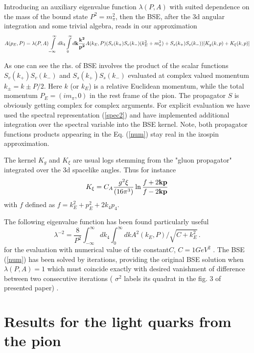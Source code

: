 \documentclass[aps,prd,superscriptaddress,eqsecnum,amsfonts,showpacs,epsfig]{revtex4}
\newcommand{\be}{\begin{equation}}
\newcommand{\ee}{\end{equation}}
\newcommand{\bea}{\begin{eqnarray}}
\newcommand{\eea}{\end{eqnarray}}
\newcommand{\nn}{\nonumber}
\begin{document}
Introducing an auxiliary 
eigenvalue function $\lambda(P,A)$ with suited dependence on the mass of the bound state $P^2=m_{\pi}^2$,    
then the BSE, after the 3d angular integration and some trivial algebra,  reads in our approximation
%
\bea \label{num}
A(p_E,P)=\lambda(P,A)\int\limits_{-\infty}^{\infty} dk_4 \int\limits_0^{\infty} d {\bf k} \frac{\bf k^2}{\bf p^2}  A(k_E,P)(S_v(k_+)S_v(k_-)(k_E^2+m_{\pi}^2)+S_s(k_+)S_s(k_-))[K_g(k,p)+K_{\xi}(k,p)]
\eea

As  one can see the rhs. of BSE involves
 the product of the scalar functions
$S_v(k_+)S_v(k_-)$ and $S_s(k_+)S_s(k_-)$ evaluated at complex valued momentum $k_{\pm}=k\pm P/2$. Here $k$ (or $k_E$) is a  relative Euclidean momentum, while the total momentum  $P_E=(im_{\pi},0)$ in the rest frame of the pion. The propagator $S$ is obviously  getting complex for complex arguments. For explicit evaluation  we have used the spectral representation (\ref{spec2}) and  have implemented additional integration over the spectral variable into the BSE kernel.  Note, both  propagator functions products  appearing in the Eq. (\ref{num}) stay real in the izospin approximation.

The kernel $K_g$ and $K_{\xi}$ are usual logs stemming from the "gluon propagator" integrated over the 3d spacelike angles. Thus for instance 
\be 
K_{\xi}=C_A\frac{g^2\xi}{(16\pi^3)} \ln\frac{f+2{\bf k p}}{f-2{\bf k p}}
\nn
\ee 
with $f$ defined as $f=k_E^2+p_E^2+2 k_4p_4$.

The following eigenvalue function has been found  particularly useful 
%
\be
\lambda^{-2}=\frac{8}{P^2}\int_{-\infty}^{\infty} dk_4 \int_0^{\infty} d k A^2(k_E,P)/\sqrt{C+k^2_E} \, .
\ee
for the evaluation with numerical value of the constant$C$,   $C=1 GeV^2$ .  
The BSE (\ref{num}) has been solved by  iterations, providing the original BSE solution when
$\lambda(P,A)=1$ which must coincide exactly with desired vanishment of difference between two 
consecutive iterations ( $\sigma^2$  labels its quadrat in the fig. 3 of presented paper) . 


\section{Results for the light quarks from the pion }
\end{document}
